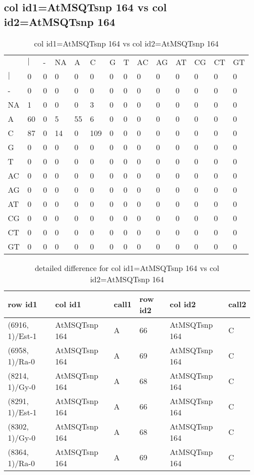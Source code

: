 \subsection{col id1=AtMSQTsnp 164 vs col id2=AtMSQTsnp 164}
\begin{center}
\begin{longtable}{|l|l|l|l|l|l|l|l|l|l|l|l|l|l|}
\caption{col id1=AtMSQTsnp 164 vs col id2=AtMSQTsnp 164} \label{table_dm734}\\
\hline
\\
\hline
&$|$&-&NA&A&C&G&T&AC&AG&AT&CG&CT&GT\\
$|$&0&0&0&0&0&0&0&0&0&0&0&0&0\\
-&0&0&0&0&0&0&0&0&0&0&0&0&0\\
NA&1&0&0&0&3&0&0&0&0&0&0&0&0\\
A&60&0&5&55&6&0&0&0&0&0&0&0&0\\
C&87&0&14&0&109&0&0&0&0&0&0&0&0\\
G&0&0&0&0&0&0&0&0&0&0&0&0&0\\
T&0&0&0&0&0&0&0&0&0&0&0&0&0\\
AC&0&0&0&0&0&0&0&0&0&0&0&0&0\\
AG&0&0&0&0&0&0&0&0&0&0&0&0&0\\
AT&0&0&0&0&0&0&0&0&0&0&0&0&0\\
CG&0&0&0&0&0&0&0&0&0&0&0&0&0\\
CT&0&0&0&0&0&0&0&0&0&0&0&0&0\\
GT&0&0&0&0&0&0&0&0&0&0&0&0&0\\
\hline
\end{longtable}
\end{center}

\begin{center}
\begin{longtable}{|l|l|l|l|l|l|}
\caption{detailed difference for col id1=AtMSQTsnp 164 vs col id2=AtMSQTsnp 164} \label{table_dm735}\\
\hline
row id1&col id1&call1&row id2&col id2&call2\\
\hline
(6916, 1)/Est-1&AtMSQTsnp 164&A&66&AtMSQTsnp 164&C\\
(6958, 1)/Ra-0&AtMSQTsnp 164&A&69&AtMSQTsnp 164&C\\
(8214, 1)/Gy-0&AtMSQTsnp 164&A&68&AtMSQTsnp 164&C\\
(8291, 1)/Est-1&AtMSQTsnp 164&A&66&AtMSQTsnp 164&C\\
(8302, 1)/Gy-0&AtMSQTsnp 164&A&68&AtMSQTsnp 164&C\\
(8364, 1)/Ra-0&AtMSQTsnp 164&A&69&AtMSQTsnp 164&C\\
\hline
\end{longtable}
\end{center}

